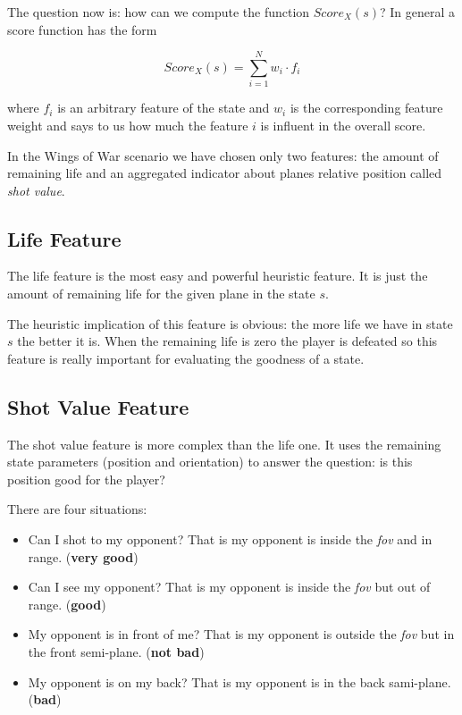 The question now is: how can we compute the function $Score_X(s)$? In general a score
function has the form

\begin{equation}
  Score_X(s) = \sum_{i=1}^N w_i \cdot f_i
\end{equation}

where $f_i$ is an arbitrary feature of the state and $w_i$ is the corresponding feature
weight and says to us how much the feature $i$ is influent in the overall score.

In the Wings of War scenario we have chosen only two features: the amount of remaining
life and an aggregated indicator about planes relative position called \emph{shot value}.

\subsection{Life Feature}

The life feature is the most easy and powerful heuristic feature. It is just the amount of
remaining life for the given plane in the state $s$.

The heuristic implication of this feature is obvious: the more life we have in state $s$
the better it is. When the remaining life is zero the player is defeated so this feature is
really important for evaluating the goodness of a state.

\subsection{Shot Value Feature}

The shot value feature is more complex than the life one. It uses the remaining state
parameters (position and orientation) to answer the question: is this position good for
the player?

There are four situations:

\begin{itemize}
  \item Can I shot to my opponent? That is my opponent is inside the \emph{fov} and
    in range. (\textbf{very good})
  \item Can I see my opponent? That is my opponent is inside the \emph{fov} but out of
    range. (\textbf{good})
  \item My opponent is in front of me? That is my opponent is outside the \emph{fov}
    but in the front semi-plane. (\textbf{not bad})
  \item My opponent is on my back? That is my opponent is in the back sami-plane.
    (\textbf{bad})
\end{itemize}

